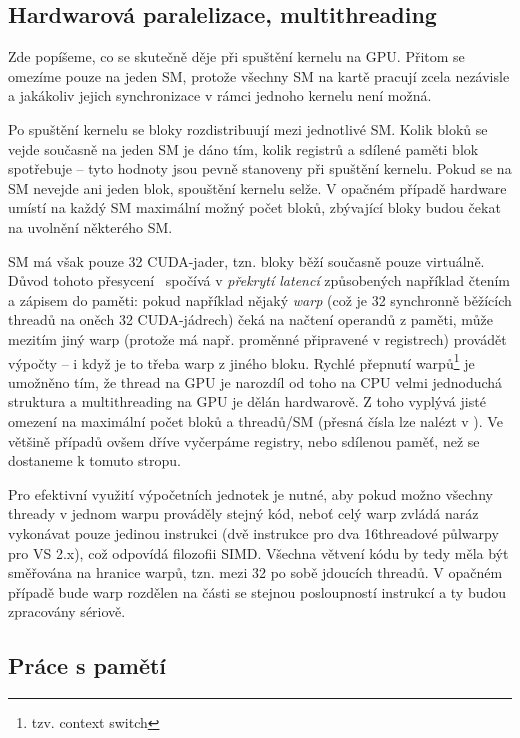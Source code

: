     \subsection{Hardwarová paralelizace, multithreading}

    Zde popíšeme, co se skutečně děje při spuštění kernelu na GPU. Přitom se omezíme pouze na jeden SM, protože všechny SM na kartě pracují zcela nezávisle a jakákoliv jejich synchronizace v rámci jednoho kernelu není možná.

    Po spuštění kernelu se bloky rozdistribuují mezi jednotlivé SM. Kolik bloků se vejde současně na jeden SM je dáno tím, kolik registrů a sdílené paměti blok spotřebuje -- tyto hodnoty jsou pevně stanoveny při spuštění kernelu. Pokud se na SM nevejde ani jeden blok, spouštění kernelu selže. V opačném případě hardware umístí na každý SM maximální možný počet bloků, zbývající bloky budou čekat na uvolnění některého SM.

    SM má však pouze 32 CUDA-jader, tzn. bloky běží současně pouze virtuálně. Důvod tohoto \bq přesycení\eq~ spočívá v \emph{překrytí latencí} způsobených například čtením a zápisem do paměti: pokud například nějaký \emph{warp} (což je 32 synchronně běžících threadů na oněch 32 CUDA-jádrech) čeká na načtení operandů z paměti, může mezitím jiný warp (protože má např. proměnné připravené v registrech) provádět výpočty -- i když je to třeba warp z jiného bloku. Rychlé přepnutí warpů\footnote{tzv. context switch} je umožněno tím, že thread na GPU je narozdíl od toho na CPU velmi jednoduchá struktura a multithreading na GPU je dělán hardwarově. Z toho vyplývá jisté omezení na maximální počet bloků a threadů/SM (přesná čísla lze nalézt v \cite{CUDA programming g.}). Ve většině případů ovšem dříve vyčerpáme registry, nebo sdílenou paměť, než se dostaneme k tomuto stropu.

    Pro efektivní využití výpočetních jednotek je nutné, aby pokud možno všechny thready v jednom warpu prováděly stejný kód, neboť celý warp zvládá naráz vykonávat pouze jedinou instrukci (dvě instrukce pro dva 16threadové půlwarpy pro VS 2.x), což odpovídá filozofii SIMD. Všechna větvení kódu by tedy měla být směřována na hranice warpů, tzn. mezi 32 po sobě jdoucích threadů. V opačném případě bude warp rozdělen na části se stejnou posloupností instrukcí a ty budou zpracovány sériově.

    \subsection{Práce s pamětí}

